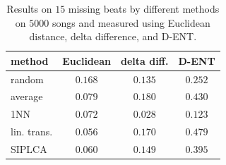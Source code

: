 \documentclass{article}
\begin{document}
\begin{table}[t]
\begin{small}
\begin{center}
\begin{tabular}{@{}l c c c @{}} 
\toprule
method & Euclidean & delta diff. & D-ENT \\ 
\midrule
random & $0.168$ & $0.135$ & $0.252$ \\
average & $0.079$ & $0.180$ & $0.430$ \\ 
1NN & $0.072$ & $\mathbf{0.028}$ & $\mathbf{0.123}$ \\
lin. trans. & $\mathbf{0.056}$ & $0.170$ & $0.479$ \\
SIPLCA & $0.060$ & $0.149$ & $0.395$ \\ 
\bottomrule
\end{tabular}
\caption{Results on $15$ missing beats by different methods
on $5000$ songs and measured using Euclidean distance, delta
difference, and D-ENT.
\label{tab:res}}
\end{center}
\end{small}
\end{table}
\end{document}
